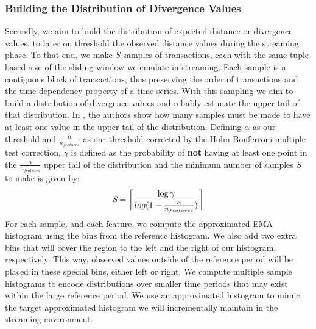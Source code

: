 \documentclass[sigconf]{acmart}
\DeclarePairedDelimiter{\ceil}{\lceil}{\rceil}
\begin{document}
\subsubsection{Building the Distribution of Divergence Values} \label{sec:sampling-batch}
Secondly, we aim to build the distribution of expected distance or divergence values, to later on threshold the observed distance values during the streaming phase. To that end, we make $S$ samples of transactions, each with the same tuple-based size of the sliding window we emulate in streaming. Each sample is a contiguous block of transactions, thus preserving the order of transactions and the time-dependency property of a time-series. With this sampling we aim to build a distribution of divergence values and reliably estimate the upper tail of that distribution. In \cite{SAMM}, the authors show how many samples must be made to have at least one value in the upper tail of the distribution. Defining $\alpha$ as our threshold and $\frac{\alpha}{n_{features}}$ as our threshold corrected by the Holm Bonferroni multiple test correction, $\gamma$ is defined as the probability of \textbf{not} having at least one point in the $\frac{\alpha}{n_{features}}$ upper tail of the distribution and the minimum number of samples $S$ to make is given by:
\begin{equation*}
    \label{eq:optimal-n-samples}
    \textit{S} = \ceil[\bigg]{\frac{\log\gamma}{log(1 - \frac{\alpha}{n_{features}})}}
\end{equation*}
For each sample, and each feature, we compute the approximated EMA histogram using the bins from the reference histogram. We also add two extra bins that will cover the region to the left and the right of our histogram, respectively. This way, observed values outside of the reference period will be placed in these special bins, either left or right. We compute multiple sample histograms to encode distributions over smaller time periods that may exist within the large reference period. We use an approximated histogram to mimic the target approximated histogram we will incrementally maintain in the streaming environment.
\end{document}
